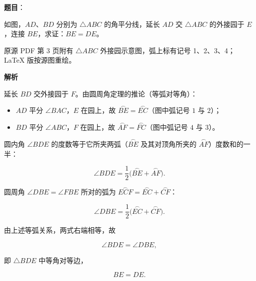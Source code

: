 \begin{answer}

\textbf{题目}：

如图，$AD\text{、}BD$ 分别为 $\triangle ABC$ 的角平分线，延长 $AD$ 交 $\triangle ABC$ 的外接园于 $E$，连接 $BE$，求证：$BE=DE$。

\begin{gktip}
原源 PDF 第 3 页附有 $\triangle ABC$ 外接园示意图，弧上标有记号 1、2、3、4；LaTeX 版按源图重绘。
\end{gktip}
\nopagebreak[4]
\begin{center}\end{center}
\nopagebreak[4]
\textbf{解析}
\nopagebreak[4]
\begin{center}\end{center}
\nopagebreak[4]
延长 $BD$ 交外接园于 $F$。由圆周角定理的推论（等弧对等角）：

\begin{itemize}
\item $AD$ 平分 $\angle BAC$，$E$ 在园上，故 $\overset{\frown}{BE}=\overset{\frown}{EC}$（图中弧记号 $1$ 与 $2$）；
\item $BD$ 平分 $\angle ABC$，$F$ 在园上，故 $\overset{\frown}{AF}=\overset{\frown}{FC}$（图中弧记号 $4$ 与 $3$）。
\end{itemize}

圆内角 $\angle BDE$ 的度数等于它所夹两弧（$\overset{\frown}{BE}$ 及其对顶角所夹的 $\overset{\frown}{AF}$）度数和的一半：

\nopagebreak[4]
\[
\angle BDE=\frac12\bigl(\overset{\frown}{BE}+\overset{\frown}{AF}\bigr).
\]

圆周角 $\angle DBE=\angle FBE$ 所对的弧为 $\overset{\frown}{ECF}=\overset{\frown}{EC}+\overset{\frown}{CF}$：

\nopagebreak[4]
\[
\angle DBE=\frac12\bigl(\overset{\frown}{EC}+\overset{\frown}{CF}\bigr).
\]

由上述等弧关系，两式右端相等，故

\nopagebreak[4]
\[
\angle BDE=\angle DBE,
\]

即 $\triangle BDE$ 中等角对等边，

\nopagebreak[4]
\[
BE=DE.
\]


\end{answer}
